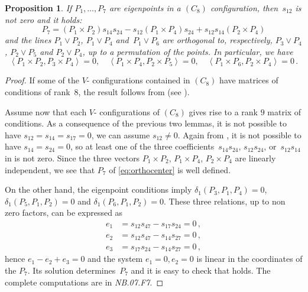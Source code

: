\documentclass[a4paper, 11pt, reqno]{amsart}
\theoremstyle{plain}
\newtheorem{prop}[lemma]{Proposition}
\theoremstyle{definition}
\newcommand{\nb}[2]{\textsl{{NB}.{#1}.{#2}}}
\newcommand{\scl}[2]{\left\langle {#1}, {#2} \right\rangle}
\begin{document}
\begin{prop}
\label{proposition:conf8_partA}
If $P_1, \dotsc, P_7$ are eigenpoints in a $(C_8)$ configuration, then~$s_{12}$ is not zero and it holds:
\begin{equation}
\label{eq:orthocenter}
P_7 = (P_1 \times P_2)s_{14}s_{24} -
  s_{12}(P_1 \times P_4)s_{24} + s_{12}s_{14}(P_2 \times P_4)
\end{equation}
and the lines $P_1 \vee P_2$, $P_1 \vee P_4$ and~$P_1 \vee P_6$
are orthogonal to, respectively, $P_3 \vee P_4$, $P_2 \vee P_5$ and
$P_2 \vee P_4$, up to a permutation of
the points. In particular, we have
%
\[
  \scl{P_1 \times P_2}{P_3 \times P_4} = 0, \quad
  \scl{P_1 \times P_4}{P_2 \times P_5} = 0, \quad
  \scl{P_1 \times P_6}{P_2 \times P_4} = 0 \,.
\]
%
\end{prop}
\begin{proof}
If some of the $V$- configurations contained in $(C_8)$ have matrices of conditions of rank~$8$,
the result follows from  (see ).

Assume now that each $V$- configurations of $(C_8)$ gives rise to a rank $9$ matrix of conditions.
As a consequence of the previous two lemmas, it is not possible
to have $s_{12}=s_{14}=s_{17}=0$, we can assume $s_{12} \not=0$.
Again from , it is not possible to
have $s_{14}=s_{24}=0$, so at least one of the three coefficients~$s_{14}s_{24}$, $s_{12}s_{24}$, or~$s_{12}s_{14}$ in  is not zero. Since the
three vectors $P_1\times P_2$, $P_1\times P_4$, $P_2\times P_4$ are linearly independent, we see that $P_7$ of \eqref{eq:orthocenter} is well defined.

On the other hand, the eigenpoint conditions imply
$\delta_1(P_3, P_1, P_4) = 0$, $\delta_1(P_5, P_1, P_2) = 0$ and
$\delta_1(P_6, P_1, P_2)=0$. These three relations, up to non zero factors, can be expressed as
%
\begin{align*}
 e_1 &= s_{12}s_{47}-s_{17}s_{24} =0\,,\\
 e_2 &= s_{12}s_{47}-s_{14}s_{27} =0\,,\\
 e_3 &= s_{17}s_{24}-s_{14}s_{27} =0\,,
\end{align*}
%
hence $e_1-e_2+e_3 = 0$ and the system
$e_1=0, e_2 = 0$ is linear in the coordinates of the $P_7$.
Its solution determines~$P_7$ and it is easy to check that  holds. The complete computations are in \nb{07}{F7}.
\end{proof}
\end{document}
